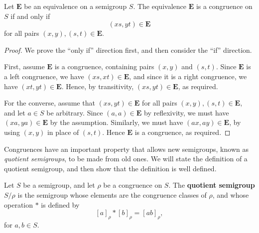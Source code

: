 \begin{proposition}
  \label{prop:cong-def}
  Let $\mathbf{E}$ be an equivalence on a semigroup $S$.  The equivalence
  $\mathbf{E}$ is a congruence on $S$ if and only if
  $$(xs, yt) \in \mathbf{E}$$
  for all pairs $(x,y), (s,t) \in \mathbf{E}$.
  \begin{proof}
    We prove the ``only if'' direction first, and then consider the ``if''
    direction.

    First, assume $\mathbf{E}$ is a congruence, containing pairs $(x,y)$ and $(s,t)$.  Since $\mathbf{E}$ is a left
    congruence, we have $(xs, xt) \in \mathbf{E}$, and since it is a right
    congruence, we have $(xt, yt) \in \mathbf{E}$.  Hence, by transitivity,
    $(xs, yt) \in \mathbf{E}$, as required.

    For the converse, assume that $(xs, yt) \in \mathbf{E}$ for all pairs
    $(x,y), (s,t) \in \mathbf{E}$, and let $a \in S$ be arbitrary.  Since
    $(a,a) \in \mathbf{E}$ by reflexivity, we must have
    $(xa, ya) \in \mathbf{E}$ by the assumption.  Similarly, we must have
    $(ax, ay) \in \mathbf{E}$, by using $(x,y)$ in place of $(s,t)$.  Hence
    $\mathbf{E}$ is a congruence, as required.
  \end{proof}
\end{proposition}

Congruences have an important property that allows new semigroups, known as
\textit{quotient semigroups}, to be made from old ones.  We will state the
definition of a quotient semigroup, and then show that the definition is well
defined.

\begin{definition}
  \label{def:quotient}
  Let $S$ be a semigroup, and let $\rho$ be a congruence on $S$.  The
  \textbf{quotient semigroup} $S / \rho$ is the semigroup whose elements are the
  congruence classes of $\rho$, and whose operation $*$ is defined by
  $$[a]_\rho * [b]_\rho = [ab]_\rho,$$
  for $a, b \in S$.
\end{definition}


